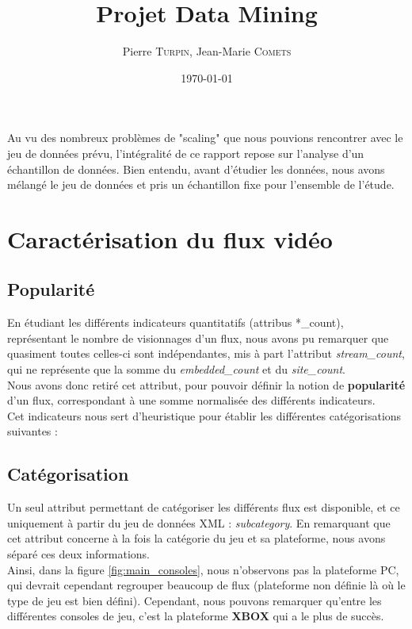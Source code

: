 \documentclass[11pt, a4paper, titlepage]{scrartcl}
\title{Projet Data Mining}
\author{Pierre \textsc{Turpin}, Jean-Marie \textsc{Comets}}
\date{\today}
\begin{document}
\maketitle
\tableofcontents
\newpage

Au vu des nombreux problèmes de "scaling" que nous pouvions rencontrer
avec le jeu de données prévu, l'intégralité de ce rapport repose sur
l'analyse d'un échantillon de données. Bien entendu, avant d'étudier les
données, nous avons mélangé le jeu de données et pris un échantillon fixe pour
l'ensemble de l'étude.

\section{Caractérisation du flux vidéo}

\subsection{Popularité}

En étudiant les différents indicateurs quantitatifs (attribus *\_count),
représentant le nombre de visionnages d'un flux, nous avons pu remarquer que
quasiment toutes celles-ci sont indépendantes, mis à part l'attribut
\textit{stream\_count}, qui ne représente que la somme du
\textit{embedded\_count} et du \textit{site\_count}. \\

Nous avons donc retiré cet attribut, pour pouvoir définir la notion de
\textbf{popularité} d'un flux, correspondant à une somme normalisée des
différents indicateurs. \\

Cet indicateurs nous sert d'heuristique pour établir les différentes
catégorisations suivantes :

\subsection{Catégorisation}

Un seul attribut permettant de catégoriser les différents flux est disponible,
et ce uniquement à partir du jeu de données XML : \textit{subcategory}. En
remarquant que cet attribut concerne à la fois la catégorie du jeu et sa
plateforme, nous avons séparé ces deux informations. \\

Ainsi, dans la figure \ref{fig:main_consoles}, nous n'observons pas la
plateforme PC, qui devrait cependant regrouper beaucoup de flux (plateforme non
définie là où le type de jeu est bien défini). Cependant, nous pouvons
remarquer qu'entre les différentes consoles de jeu, c'est la plateforme \textbf{XBOX}
qui a le plus de succès. \\
\end{document}
